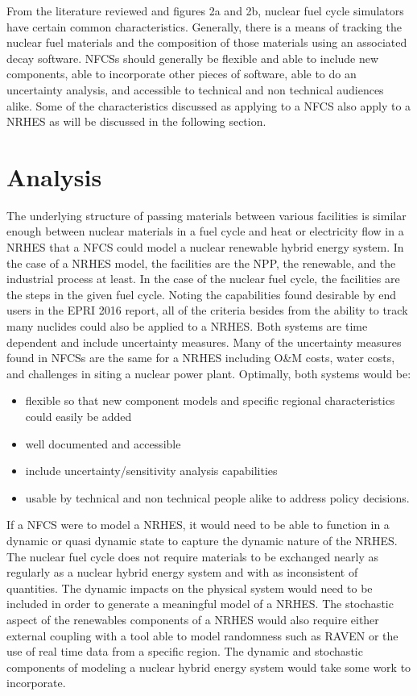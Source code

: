 \documentclass{article}                                                                           %
\begin{document}
\begin{linenumbers}
From the literature reviewed and figures 2a and 2b, nuclear fuel cycle simulators have certain common characteristics. Generally, there is a means of tracking the nuclear fuel materials and the composition of those materials using an associated decay software. NFCSs should generally be flexible and able to include new components, able to incorporate other pieces of software, able to do an uncertainty analysis, and accessible to technical and non technical audiences alike. Some of the characteristics discussed as applying to a NFCS also apply to a NRHES as will be discussed in the following section.

\section{Analysis}
The underlying structure of passing materials between various facilities is similar enough between nuclear materials in a fuel cycle and heat or electricity flow in a NRHES that a NFCS could model a nuclear renewable hybrid energy system. In the case of a NRHES model, the facilities are the NPP, the renewable, and the industrial process at least.  In the case of the nuclear fuel cycle, the facilities are the steps in the given fuel cycle. Noting the capabilities found desirable by end users in the EPRI 2016 report, all of the criteria besides from the ability to track many nuclides could also be applied to a NRHES. Both systems are time dependent and include uncertainty measures. Many of the uncertainty measures found in NFCSs are the same for a NRHES including O\&M costs, water costs, and challenges in siting a nuclear power plant. Optimally, both systems would be:
\begin{itemize}

\item flexible so that new component models and specific regional characteristics could easily be added
\item well documented and accessible
\item include uncertainty/sensitivity analysis capabilities
\item usable by technical and non technical people alike to address policy decisions.

\end{itemize}

If a NFCS were to model a NRHES, it would need to be able to function in a dynamic or quasi dynamic state to capture the dynamic nature of the NRHES.  The nuclear fuel cycle does not require materials to be exchanged nearly as regularly as a nuclear hybrid energy system and with as inconsistent of quantities. The dynamic impacts on the physical system would need to be included in order to generate a meaningful model of a NRHES. The stochastic aspect of the renewables components of a NRHES would also require either external coupling with a tool able to model randomness such as RAVEN or the use of real time data from a specific region. The dynamic and stochastic components of modeling a nuclear hybrid energy system would take some work to incorporate.


\end{linenumbers}
\end{document}
